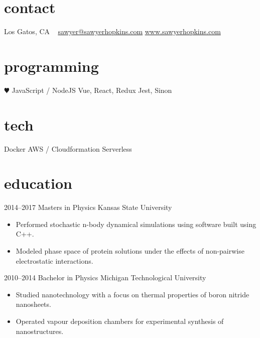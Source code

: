 \documentclass[]{friggeri-cv} %
\begin{document}


\begin{aside} %
\section{contact}
Los Gatos, CA
~
\href{mailto:sawyer@sawyerhopkins.com}{sawyer@sawyerhopkins.com}
\href{http://www.sawyerhopkins.com}{www.sawyerhopkins.com}
\section{programming}
{\color{red} $\varheartsuit$} JavaScript / NodeJS
Vue, React, Redux
Jest, Sinon
\section{tech}
Docker
AWS / Cloudformation
Serverless
\end{aside}


\section{education}

\begin{entrylist}


\entry
{2014--2017}
{Masters {\normalfont in Physics}}
{Kansas State University}
{\begin{itemize}
\item Performed stochastic n-body dynamical simulations using software built using C++.
\item Modeled phase space of protein solutions under the effects of non-pairwise electrostatic interactions.
\end{itemize}}


\entry
{2010--2014}
{Bachelor {\normalfont in Physics}}
{Michigan Technological University}
{\begin{itemize}
\item Studied nanotechnology with a focus on thermal properties of boron nitride nanosheets.
\item Operated vapour deposition chambers for experimental synthesis of nanostructures.
\end{itemize}}


\end{entrylist}
\end{document}
